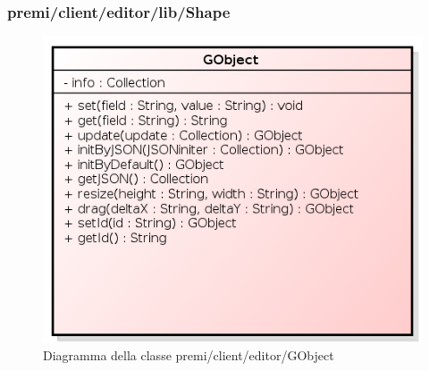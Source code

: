 \begin{description}
	
	
\end{description}


\subsubsection{premi/client/editor/lib/Shape}
\begin{figure}[h]
\begin{center}
\includegraphics[scale=0.40]{img/diacla/GObject.png}
\caption{Diagramma della classe premi/client/editor/GObject}
\end{center}
\end{figure}

